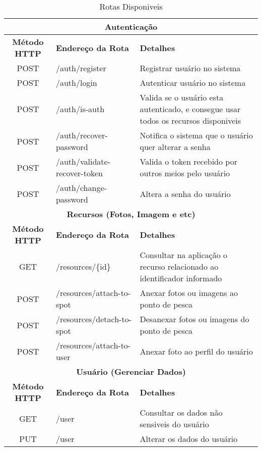\begin{table}[h!]
    \centering
    \caption[Rotas Disponiveis]{Rotas Disponiveis
    \label{tab:tb-api-fishspot}}
    \setlength{\extrarowheight}{4pt}
    \begin{tabular}{|c|l|p{}|} 
        \hline
        \multicolumn{3}{|c|}{\textbf{Autenticação}} \\
        \hline
        \textbf{Método HTTP} & \textbf{Endereço da Rota} & \textbf{Detalhes} \\
        \hline
        POST & /auth/register & Registrar usuário no sistema \\
        \hline
        POST & /auth/login & Autenticar usuário no sistema \\
        \hline
        POST & /auth/is-auth & Valida se o usuário esta autenticado, e consegue usar todos os recursos disponiveis \\
        \hline
        POST & /auth/recover-password & Notifica o sistema que o usuário quer alterar a senha \\
        \hline
        POST & /auth/validate-recover-token & Valida o token recebido por outros meios pelo usuário \\
        \hline
        POST & /auth/change-password & Altera a senha do usuário \\
        \hline


        \multicolumn{3}{|c|}{\textbf{Recursos (Fotos, Imagem e etc)}} \\
        \hline
        \textbf{Método HTTP} & \textbf{Endereço da Rota} & \textbf{Detalhes} \\
        \hline
        GET & /resources/\{id\} & Consultar na aplicação o recurso relacionado ao identificador informado \\
        \hline
        POST & /resources/attach-to-spot & Anexar fotos ou imagens ao ponto de pesca \\
        \hline
        POST & /resources/detach-to-spot & Desanexar fotos ou imagens do ponto de pesca \\
        \hline
        POST & /resources/attach-to-user & Anexar foto ao perfil do usuário \\
        \hline


        \multicolumn{3}{|c|}{\textbf{Usuário (Gerenciar Dados)}} \\
        \hline
        \textbf{Método HTTP} & \textbf{Endereço da Rota} & \textbf{Detalhes} \\
        \hline
        GET & /user & Consultar os dados não sensiveis do usuário \\
        \hline
        PUT & /user & Alterar os dados do usuário \\
        \hline

    \end{tabular}
\end{table}

